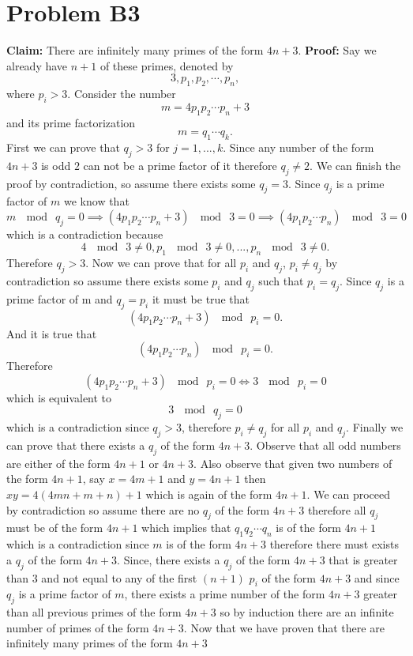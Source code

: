 \documentclass[12pt]{article}
\begin{document}
\newpage
\section*{Problem B3}
\textbf{Claim:} There are infinitely many primes of the form $4n+3$.
\newline
\textbf{Proof:} Say we already have $n+1$ of these primes, denoted by
$$3, p_1, p_2, \cdots, p_n,$$
where $p_i > 3$. Consider the number
$$m = 4p_1p_2 \cdots p_n + 3$$
and its prime factorization
$$m=q_1 \cdots q_k.$$
First we can prove that $q_j > 3$ for $j = 1,...,k$. Since any number of the
form $4n+3$ is odd $2$ can not be a prime factor of it therefore $q_j \neq 2$.
We can finish the proof by
contradiction, so assume there exists some $q_j = 3$. Since $q_j$ is a prime
factor of $m$ we know that
$$m\ \mod\ q_j = 0 \implies (4p_1p_2 \cdots p_n + 3)\ \mod\ 3 = 0
\implies (4p_1p_2 \cdots p_n)\ \mod\ 3 = 0$$
which is a contradiction because
$$4\ \mod\ 3 \neq 0,p_1\ \mod\ 3 \neq 0,...,p_n\ \mod\ 3 \neq 0.$$
Therefore $q_j > 3$. Now we can prove that for all $p_i$ and $ q_j$,
$p_i \neq q_j$ by contradiction so assume there exists some $p_i$ and $q_j$ such
that $p_i = q_j$. Since $q_j$ is a prime factor of m and $q_j = p_i$ it must be
true that
$$(4p_1p_2 \cdots p_n + 3)\ \mod\ p_i = 0.$$
And it is true that
$$(4p_1p_2 \cdots p_n)\ \mod\ p_i = 0.$$
Therefore
$$(4p_1p_2 \cdots p_n + 3)\ \mod\ p_i = 0 \iff 3\ \mod\ p_i = 0$$
which is equivalent to
$$3\ \mod\ q_j = 0$$
which is a contradiction since $q_j > 3$, therefore $p_i \neq q_j$ for all $p_i$
and $q_j$. Finally we can prove that there exists a $q_j$ of the form $4n+3$.
Observe that all odd numbers are either of the form $4n+1$ or $4n+3$. Also
observe that given two numbers of the form $4n+1$, say $x = 4m+1$ and
$y = 4n+1$ then $xy = 4(4mn + m + n) + 1$ which is again of the form $4n+1$.
We can proceed by contradiction so assume there are no $q_j$ of the form
$4n+3$ therefore all $q_j$ must be of the form $4n+1$ which implies that
$q_1q_2\cdots q_n$ is of the form $4n+1$ which is a contradiction since $m$ is
of the form $4n+3$ therefore there must exists a $q_j$ of the form $4n+3$.
Since, there exists a $q_j$ of the form $4n+3$ that is greater than $3$ and not
equal to any of the first $(n+1)$ $p_i$ of the form $4n+3$ and since $q_j$ is a
prime factor of $m$, there exists a prime number of the form $4n+3$ greater than
all previous primes of the form $4n+3$ so by induction there are an infinite
number of primes of the form $4n+3$.
\medskip
\newline
Now that we have proven that there are infinitely many primes of the form $4n+3$
\end{document}
